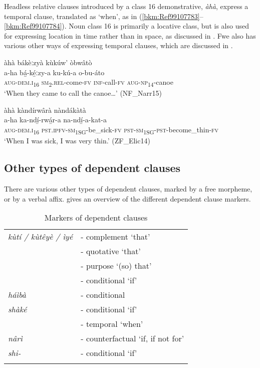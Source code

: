 Headless relative clauses introduced by a class 16 demonstrative, \textit{àhà}, express a temporal clause, translated as ‘when’, as in (\ref{bkm:Ref99107783}--\ref{bkm:Ref99107784}). Noun class 16 is primarily a locative class, but is also used for expressing location in time rather than in space, as discussed in . Fwe also has various other ways of expressing temporal clauses, which are discussed in .

\ea
\label{bkm:Ref99107783}
àhà bákèːzyà kùkúw’ òbwâtò\\
\gll a-ha    bá̲-ké̲ːzy-a    ku-kú-a  o-bu-áto\\
\textsc{aug}-\textsc{dem}.\textsc{i}\textsubscript{16}  \textsc{sm}\textsubscript{2}.\textsc{rel}-come-\textsc{fv}  \textsc{inf}-call-\textsc{fv}  \textsc{aug}-\textsc{np}\textsubscript{14}-canoe\\
\glt ‘When they came to call the canoe…’ (NF\_Narr15)
\z

\ea
\label{bkm:Ref99107784}
àhà kàndírwârà nàndákàtà\\
\gll a-ha    ka-ndí̲-rwá̲r-a    na-ndí̲-a-kat-a\\
\textsc{aug}-\textsc{dem}.\textsc{i}\textsubscript{16} \textsc{pst}.\textsc{ipfv}-\textsc{sm}\textsubscript{1SG}-be\_sick-\textsc{fv}  \textsc{pst}-\textsc{sm}\textsubscript{1SG}-\textsc{pst}-become\_thin-\textsc{fv}\\
\glt ‘When I was sick, I was very thin.’ (ZF\_Elic14)
\z

\largerpage
\subsection{Other types of dependent clauses}
\label{bkm:Ref491770136}\hypertarget{Toc75352718}{}
There are various other types of dependent clauses, marked by a free morpheme, or by a verbal affix.  gives an overview of the different dependent clause markers.

\begin{table}
\label{bkm:Ref490824259}\caption{\label{tab:13:2}Markers of dependent clauses}

\begin{tabular}{ll}
\lsptoprule
\textit{kùtí / kùtêyè / ìyé} & - complement ‘that’\\
                             & - quotative ‘that’\\
                             & - purpose ‘(so) that’\\\
                             & - conditional ‘if’\\
\textit{háìbà} & - conditional \\
\textit{shàké} & - conditional ‘if’\\
               & - temporal ‘when’\\
\textit{nârì} & - counterfactual ‘if, if not for’\\
{\itshape shi-}  & - conditional ‘if’\\
\lspbottomrule
\end{tabular}
\end{table}


